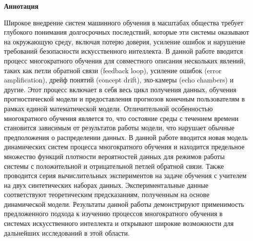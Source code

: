 \begin{center}
    \Large{\textbf{Аннотация}}
\end{center}

Широкое внедрение систем машинного обучения в масштабах общества требует глубокого понимания долгосрочных последствий, которые эти системы оказывают на окружающую среду, включая потерю доверия, усиление ошибок и нарушение требований безопасности искусственного интеллекта.
В данной работе вводится процесс многократного обучения для совместного описания нескольких явлений, таких как петли обратной связи (feedback loop), усиление ошибок (error amplification), дрейф понятий (concept drift), эхо-камеры (echo chambers) и другие. Этот процесс включает в себя весь цикл получения данных, обучения прогностической модели и предоставления прогнозов конечным пользователям в рамках единой математической модели.
Отличительной особенностью многократного обучения является то, что состояние среды с течением времени становится зависимым от результатов работы модели, что нарушает обычные предположения о распределении данных.
В данной работе вводится новая модель динамических систем процесса многократного обучения и находится предельное множество функций плотности вероятностей данных для режимов работы системы с положительной и отрицательной петлей обратной связи.
Также проводится серия вычислительных экспериментов на задаче обучения с учителем на двух синтетических наборах данных. Экспериментальные данные соответствуют теоретическим предсказаниям, полученным на основе динамической модели. Результаты данной работы демонстрируют применимость предложенного подхода к изучению процессов многократного обучения в системах искусственного интеллекта и открывают широкие возможности для дальнейших исследований в этой области.